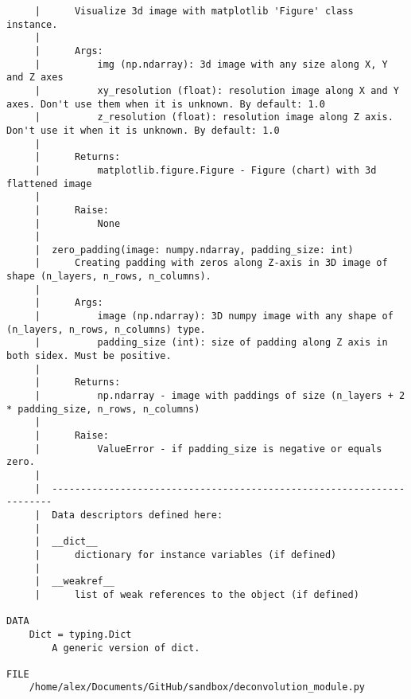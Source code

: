 \begin{lstlisting}
     |      Visualize 3d image with matplotlib 'Figure' class instance.
     |      
     |      Args:
     |          img (np.ndarray): 3d image with any size along X, Y and Z axes
     |          xy_resolution (float): resolution image along X and Y axes. Don't use them when it is unknown. By default: 1.0
     |          z_resolution (float): resolution image along Z axis. Don't use it when it is unknown. By default: 1.0
     |      
     |      Returns:
     |          matplotlib.figure.Figure - Figure (chart) with 3d flattened image
     |      
     |      Raise:
     |          None
     |  
     |  zero_padding(image: numpy.ndarray, padding_size: int)
     |      Creating padding with zeros along Z-axis in 3D image of shape (n_layers, n_rows, n_columns).
     |      
     |      Args:
     |          image (np.ndarray): 3D numpy image with any shape of (n_layers, n_rows, n_columns) type.
     |          padding_size (int): size of padding along Z axis in both sidex. Must be positive.
     |      
     |      Returns:
     |          np.ndarray - image with paddings of size (n_layers + 2 * padding_size, n_rows, n_columns)
     |      
     |      Raise:
     |          ValueError - if padding_size is negative or equals zero.
     |  
     |  ----------------------------------------------------------------------
     |  Data descriptors defined here:
     |  
     |  __dict__
     |      dictionary for instance variables (if defined)
     |  
     |  __weakref__
     |      list of weak references to the object (if defined)

DATA
    Dict = typing.Dict
        A generic version of dict.

FILE
    /home/alex/Documents/GitHub/sandbox/deconvolution_module.py
\end{lstlisting}

